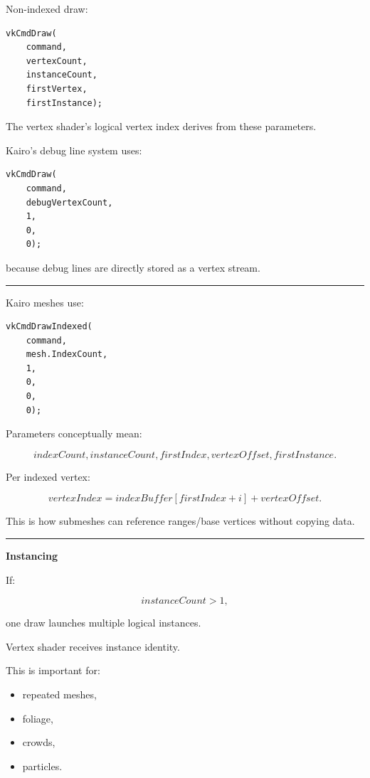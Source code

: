 \textbf{}

Non-indexed draw:

\begin{verbatim}
vkCmdDraw(
    command,
    vertexCount,
    instanceCount,
    firstVertex,
    firstInstance);
\end{verbatim}

The vertex shader's logical vertex index derives from these parameters.

Kairo's debug line system uses:

\begin{verbatim}
vkCmdDraw(
    command,
    debugVertexCount,
    1,
    0,
    0);
\end{verbatim}

because debug lines are directly stored as a vertex stream.

\begin{center}\rule{0.5\linewidth}{0.5pt}\end{center}

\textbf{}

Kairo meshes use:

\begin{verbatim}
vkCmdDrawIndexed(
    command,
    mesh.IndexCount,
    1,
    0,
    0,
    0);
\end{verbatim}

Parameters conceptually mean:

\[
indexCount,
instanceCount,
firstIndex,
vertexOffset,
firstInstance.
\]

Per indexed vertex:

\[
vertexIndex
=
indexBuffer[firstIndex+i]
+
vertexOffset.
\]

This is how submeshes can reference ranges/base vertices without copying data.

\begin{center}\rule{0.5\linewidth}{0.5pt}\end{center}

\textbf{Instancing}

If:

\[
instanceCount>1,
\]

one draw launches multiple logical instances.

Vertex shader receives instance identity.

This is important for:

\begin{itemize}
\tightlist
\item
  repeated meshes,
\item
  foliage,
\item
  crowds,
\item
  particles.
\end{itemize}

